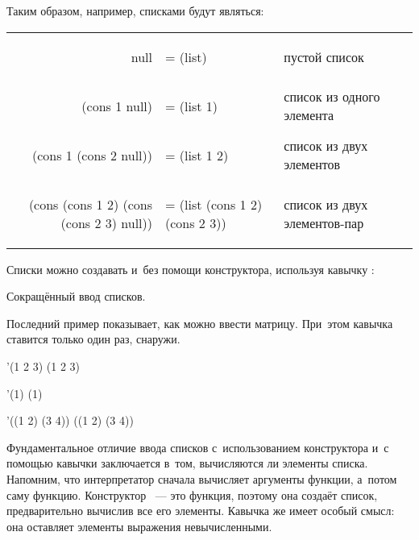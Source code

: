 \newpage
Таким образом, например, списками будут являться:

\smallskip
\noindent
\begin{tabular}{rl>{\comment}p{2.5cm}}

\begin{ExampleCode}
 null
\end{ExampleCode}& 
\begin{ExampleCode}
= (list)
\end{ExampleCode}& пустой список\\
\begin{ExampleCode}
 (cons 1 null)
\end{ExampleCode}&
\begin{ExampleCode}
= (list 1)
\end{ExampleCode}& список из одного элемента\\
\begin{ExampleCode}
 (cons 1 (cons 2 null))
\end{ExampleCode}&
\begin{ExampleCode}
= (list 1 2)
\end{ExampleCode}& список из двух элементов\\
\begin{ExampleCode}
 (cons (cons 1 2) 
       (cons (cons 2 3)
             null))
\end{ExampleCode} &
\begin{ExampleCode}
= (list (cons 1 2) 
        (cons 2 3))
\end{ExampleCode} & список из двух элементов-пар
\end{tabular}

Списки можно создавать и~без помощи конструктора, используя кавычку :

\begin{example}{Сокращённый ввод списков.

Последний пример показывает, как можно ввести матрицу. При~этом кавычка ставится только один раз, снаружи.}
\REPL
  {'(1 2 3)}
  {(1 2 3)}

\REPL
  {'(1)}
  {(1)}

\REPL
  {'((1 2) (3 4))}
  {((1 2) (3 4))}
\end{example}

Фундаментальное отличие ввода списков с~использованием конструктора и~с помощью кавычки заключается в~том, вычисляются ли элементы списка. Напомним, что интерпретатор \Scheme сначала вычисляет аргументы функции, а~потом саму функцию. Конструктор ~--- это функция, поэтому она создаёт список, предварительно вычислив все его элементы. Кавычка же имеет особый смысл: она оставляет элементы выражения невычисленными. 

